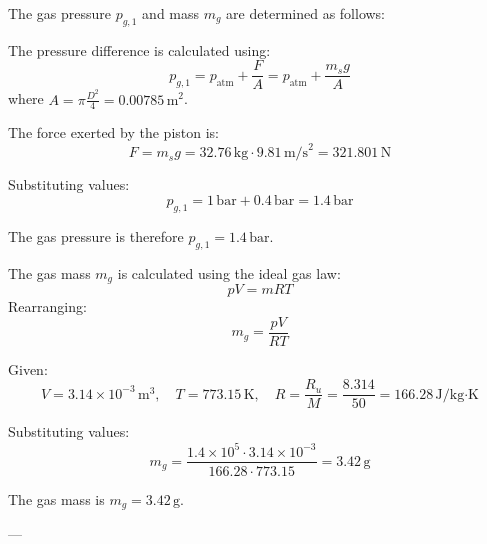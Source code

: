 The gas pressure \( p_{g,1} \) and mass \( m_g \) are determined as follows:  

The pressure difference is calculated using:  
\[
p_{g,1} = p_{\text{atm}} + \frac{F}{A} = p_{\text{atm}} + \frac{m_s g}{A}
\]  
where \( A = \pi \frac{D^2}{4} = 0.00785 \, \text{m}^2 \).  

The force exerted by the piston is:  
\[
F = m_s g = 32.76 \, \text{kg} \cdot 9.81 \, \text{m/s}^2 = 321.801 \, \text{N}
\]  

Substituting values:  
\[
p_{g,1} = 1 \, \text{bar} + 0.4 \, \text{bar} = 1.4 \, \text{bar}
\]  

The gas pressure is therefore \( p_{g,1} = 1.4 \, \text{bar} \).  

The gas mass \( m_g \) is calculated using the ideal gas law:  
\[
p V = m R T
\]  
Rearranging:  
\[
m_g = \frac{p V}{R T}
\]  

Given:  
\[
V = 3.14 \times 10^{-3} \, \text{m}^3, \quad T = 773.15 \, \text{K}, \quad R = \frac{R_u}{M} = \frac{8.314}{50} = 166.28 \, \text{J/kg·K}
\]  

Substituting values:  
\[
m_g = \frac{1.4 \times 10^5 \cdot 3.14 \times 10^{-3}}{166.28 \cdot 773.15} = 3.42 \, \text{g}
\]  

The gas mass is \( m_g = 3.42 \, \text{g} \).  

---